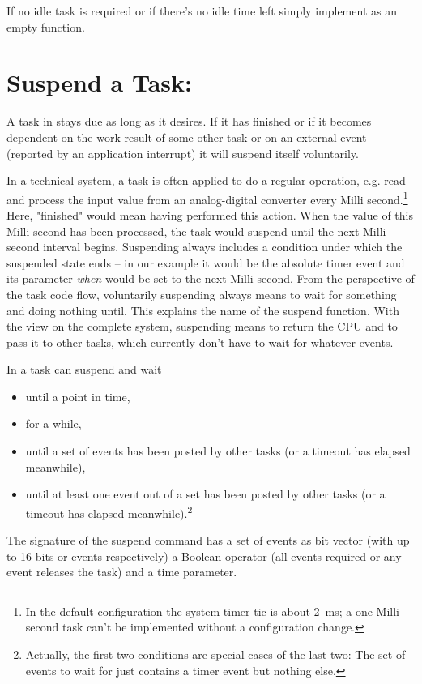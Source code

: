 If no idle task is required or if there's no idle time left simply
implement  as an empty function.


\section{Suspend a Task: }
\label{secAPIWaitForEvent}

A task in \rtos{} stays due as long as it desires. If it has finished or
if it becomes dependent on the work result of some other task or on an
external event (reported by an application interrupt) it will suspend
itself voluntarily.

In a technical system, a task is often applied to do a regular operation,
e.g. read and process the input value from an analog-digital converter
every Milli second.\footnote{In the \rtos{} default configuration the
system timer tic is about 2~ms; a one Milli second task can't be
implemented without a configuration change.} Here, "finished" would mean
having performed this action. When the value of this Milli second has been
processed, the task would suspend until the next Milli second interval
begins. Suspending always includes a condition under which the suspended
state ends -- in our example it would be the absolute timer event and its
parameter \emph{when} would be set to the next Milli second. From the
perspective of the task code flow, voluntarily suspending always means to
wait for something and doing nothing until. This explains the name of the
suspend function. With the view on the complete system, suspending means
to return the CPU and to pass it to other tasks, which currently don't
have to wait for whatever events.

In \rtos{} a task can suspend and wait
\begin{itemize}
  \item until a point in time,
  \item for a while,
  \item until a set of events has been posted by other tasks (or a timeout
    has elapsed meanwhile),
  \item until at least one event out of a set has been posted by other
    tasks (or a timeout has elapsed meanwhile).\footnote{Actually, the
    first two conditions are special cases of the last two: The set of
    events to wait for just contains a timer event but nothing else.}
\end{itemize}

The signature of the suspend command has a set of events as bit vector
(with up to 16 bits or events respectively) a Boolean operator (all events
required or any event releases the task) and a time parameter.

